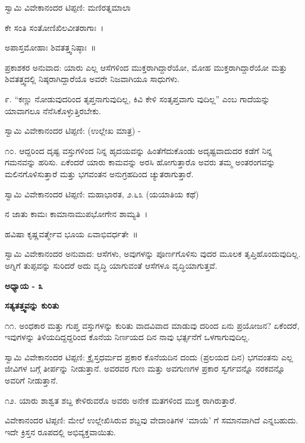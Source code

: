 ಸ್ವಾಮಿ ವಿವೇಕಾನಂದರ ಟಿಪ್ಪಣಿ: ಮಣಿರತ್ನಮಾಲಾ

ಕೇ ಸಂತಿ ಸಂತೋಣಿಖಿಲವೀತರಾಗಾಃ~।

ಅಪಾಸ್ತಮೋಹಾಃ ಶಿವತತ್ತ್ವನಿಷ್ಠಾಃ~॥

ಪ್ರಕಾಶಕರ ಅನುವಾದ: ಯಾರು ಎಲ್ಲ ಆಸೆಗಳಿಂದ ಮುಕ್ತರಾಗಿದ್ದಾರೆಯೋ, ಮೋಹ ಮುಕ್ತರಾಗಿದ್ದಾರೆಯೋ ಮತ್ತು ಶಿವತತ್ತ್ವದಲ್ಲಿ ನಿಷ್ಠರಾಗಿದ್ದಾರೆಯೊ ಅವರೇ ನಿಜವಾಗಿಯೂ ಸಾಧುಗಳು.

೯. “ಕಣ್ಣು ನೋಡುವುದರಿಂದ ತೃಪ್ತನಾಗುವುದಿಲ್ಲ, ಕಿವಿ ಕೇಳಿ ಸಂತೃಪ್ತವಾಗು ವುದಿಲ್ಲ” ಎಂಬ ಗಾದೆಯನ್ನು ಯಾವಾಗಲೂ ನೆನೆಸಿಕೊಳ್ಳುತ್ತಿರಬೇಕು. 

ಸ್ವಾಮಿ ವಿವೇಕಾನಂದರ ಟಿಪ್ಪಣಿ: (ಉಲ್ಲೇಖ ಮಾತ್ರ) - 

೧೦. ಆದ್ದರಿಂದ ದೃಷ್ಟ ವಸ್ತುಗಳಿಂದ ನಿನ್ನ ಹೃದಯವನ್ನು ಹಿಂತೆಗೆದುಕೊಂಡು ಅದೃಷ್ಟವಾದುದರ ಕಡೆಗೆ ನಿನ್ನ ಗಮನವನ್ನು ಹರಿಸು. ಏಕೆಂದರೆ ಯಾರು ಕಾಮವನ್ನು ಅರಸಿ ಹೋಗುತ್ತಾರೊ ಅವರು ತಮ್ಮ ಅಂತರಂಗವನ್ನು ಮಲಿನಗೊಳಿಸುತ್ತಾರೆ ಮತ್ತು ಭಗವಂತನ ಅನುಗ್ರಹದಿಂದ ಚ್ಯುತರಾಗುತ್ತಾರೆ. 

ಸ್ವಾಮಿ ವಿವೇಕಾನಂದರ ಟಿಪ್ಪಣಿ: ಮಹಾಭಾರತ, ೨.೬೩ (ಯಯಾತಿಯ ಕಥೆ)

ನ ಜಾತು ಕಾಮಃ ಕಾಮಾನಾಮುಪಭೋಗೇನ ಶಾಮ್ಯತಿ~।

ಹವಿಷಾ ಕೃಷ್ಣವರ್ತ್ಮೇವ ಭೂಯ ಏವಾಭಿವರ್ಧತೇ~॥

ಸ್ವಾಮಿ ವಿವೇಕಾನಂದರ ಅನುವಾದ: ಆಸೆಗಳು, ಅವುಗಳನ್ನು ಪೂರ್ಣಗೊಳಿಸು ವುದರ ಮೂಲಕ ತೃಪ್ತಿಹೊಂದುವುದಿಲ್ಲ. ಅಗ್ನಿಗೆ ತುಪ್ಪವನ್ನು ಸುರಿದರೆ ಅದು ವೃದ್ಧಿ ಯಾಗುವಂತೆ ಆಸೆಗಳೂ ವೃದ್ಧಿಯಾಗುತ್ತವೆ.

\begin{center}
\textbf{ಅಧ್ಯಾಯ - ೩}
\end{center}

\begin{center}
\textbf{ಸತ್ಯತತ್ತ್ವವನ್ನು ಕುರಿತು}
\end{center}

೧೧. ಅಂಧಕಾರ ಮತ್ತು ಗುಪ್ತ ವಸ್ತುಗಳನ್ನು ಕುರಿತು ವಾದವಿವಾದ ಮಾಡುವು ದರಿಂದ ಏನು ಪ್ರಯೋಜನ? ಏಕೆಂದರೆ, ಇವುಗಳನ್ನು ತಿಳಿಯದಿದ್ದದ್ದರಿಂದ ಕೊನೆಯ ನಿರ್ಣಯದ ದಿನ ನಾವು ಭರ್ತ್ಸನೆಗೆ ಒಳಗಾಗುವುದಿಲ್ಲ. 

ಸ್ವಾಮಿ ವಿವೇಕಾನಂದರ ಟಿಪ್ಪಣಿ: ಕ್ರೈಸ್ತಧರ್ಮದ ಪ್ರಕಾರ ಕೊನೆಯದಿನ ದಂದು (ಪ್ರಲಯದ ದಿನ) ಭಗವಂತನು ಎಲ್ಲ ಜೀವಿಗಳ ಬಗ್ಗೆ ತೀರ್ಪನ್ನು ನೀಡುತ್ತಾನೆ. ಅವರವರ ಗುಣ ಮತ್ತು ಅವಗುಣಗಳ ಪ್ರಕಾರ ಸ್ವರ್ಗವನ್ನೊ ನರಕವನ್ನೊ ಅವರಿಗೆ ನೀಡುತ್ತಾನೆ.

೧೨. ಯಾರು ಶಾಶ್ವತ ಶಬ್ದ ಕೇಳಿರುವರೊ ಅವರು ಅನೇಕ ಮತಗಳಿಂದ ಮುಕ್ತ ರಾಗಿರುತ್ತಾರೆ. 

ವಿವೇಕಾನಂದರ ಟಿಪ್ಪಣಿ: ಮೇಲೆ ಉಲ್ಲೇಖಿಸಿರುವ ಶಬ್ದವು ವೇದಾಂತಿಗಳ ‘ಮಾಯೆ’ ಗೆ ಸಮಾನವಾಗಿದೆ ಎನ್ನಬಹುದು. ಇದೇ ಕ್ರಿಸ್ತನ ರೂಪದಲ್ಲಿ ಅಭಿವ್ಯಕ್ತವಾಯಿತು.

